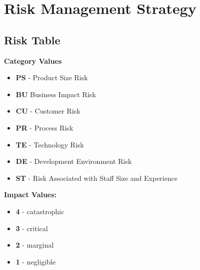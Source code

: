 \documentclass[english,12pt]{article}
\begin{document}
\section{Risk Management Strategy}

\subsection{Risk Table}
\begin{varwidth}[t]{.5\textwidth}
  \textbf{Category Values}
  \begin{itemize}
    \item \textbf{PS} - Product Size Risk
    \item \textbf{BU} Business Impact Risk
    \item \textbf{CU} - Customer Risk
    \item \textbf{PR} - Process Risk
    \item \textbf{TE} - Technology Risk 
    \item \textbf{DE} - Development Environment Risk
    \item \textbf{ST} - Risk Associated with Staff Size and Experience 
  \end{itemize}
  \end{varwidth}
  \hspace{4em}
  \begin{varwidth}[t]{.5\textwidth}
  \textbf{Impact Values:}
  \begin{itemize}
    \item \textbf{4} - catastrophic
    \item \textbf{3} - critical
    \item \textbf{2} - marginal
    \item \textbf{1} - negligible
  \end{itemize}
\end{varwidth}
\end{document}
